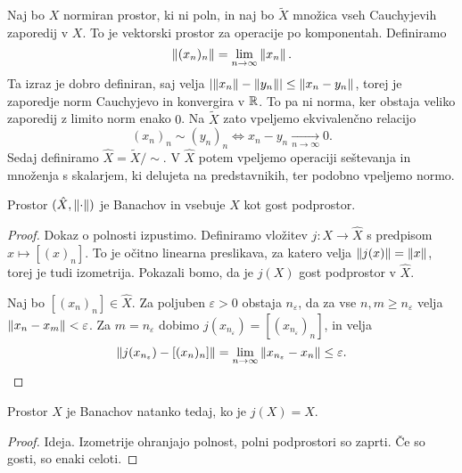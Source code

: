 
Naj bo $X$ normiran prostor, ki ni poln, in naj bo $\tilde{X}$ množica vseh
Cauchyjevih zaporedij v $X$.
To je vektorski prostor za operacije po komponentah.
Definiramo
\[
  \left\lVert(x_n)_n\right\rVert = \lim_{n \to \infty} \left\lVert x_n\right\rVert.
\]
Ta izraz je dobro definiran, saj velja $\left| \left\lVert x_n\right\rVert - \left\lVert y_n\right\rVert \right| \le
\left\lVert x_n - y_n\right\rVert$, torej je zaporedje norm Cauchyjevo in konvergira v $\mathbb{R}$.
To pa ni norma, ker obstaja veliko zaporedij z limito norm enako $0$.
Na $\tilde{X}$ zato vpeljemo ekvivalenčno relacijo
\[
  (x_n)_n \sim (y_n)_n \iff x_n - y_n \xrightarrow[n \to \infty]{} 0.
\]
Sedaj definiramo $\hat{X} = \tilde{X} / \sim$.
V $\hat{X}$ potem vpeljemo operaciji seštevanja in množenja s skalarjem, ki
delujeta na predstavnikih, ter podobno vpeljemo normo.

\begin{izrek}
  Prostor $(\hat{X}, \left\lVert\cdot\right\rVert)$ je Banachov in vsebuje $X$ kot gost
  podprostor.
\end{izrek}

\begin{proof}
  Dokaz o polnosti izpustimo.
  Definiramo vložitev $j: X \to \hat{X}$ s predpisom $x \mapsto [(x)_n]$.
  To je očitno linearna preslikava, za katero velja $\left\lVert j(x)\right\rVert = \left\lVert x\right\rVert$,
  torej je tudi izometrija.
  Pokazali bomo, da je $j(X)$ gost podprostor v $\hat{X}$.

  Naj bo $[(x_n)_n] \in \hat{X}$.
  Za poljuben $\varepsilon > 0$ obstaja $n_\varepsilon$, da za vse $n, m \ge
  n_\varepsilon$ velja $\left\lVert x_n - x_m\right\rVert < \varepsilon$.
  Za $m = n_\varepsilon$ dobimo $j(x_{n_\varepsilon}) =
  [(x_{n_\varepsilon})_n]$, in velja
  \[
	\left\lVert j(x_{n_\varepsilon}) - [(x_n)_n]\right\rVert = \lim_{n \to \infty}
	\left\lVert x_{n_\varepsilon} - x_n\right\rVert \le \varepsilon.
	\qedhere
  \]
\end{proof}


\begin{posledica}
  Prostor $X$ je Banachov natanko tedaj, ko je $j(X) = \hat{X}$.
\end{posledica}

\begin{proof}
  Ideja.
  Izometrije ohranjajo polnost, polni podprostori so zaprti.
  Če so gosti, so enaki celoti.
\end{proof}


